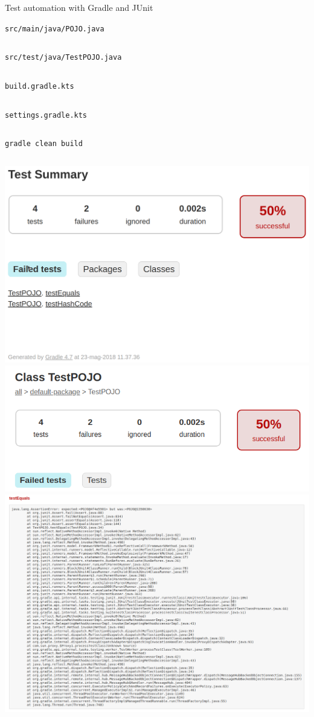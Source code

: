 \documentclass[presentation]{beamer}
\newcommand{\codefile}[4]{
	\begin{block}{\texttt{#2}}
		\inputminted[fontsize=#3,linenos=true,breaklines=true]{#4}{"workspace/#1/#2"}
	\end{block}
}
\newcommand{\java}[3]{\codefile{#1}{#2}{#3}{java}}
\newcommand{\groovy}[3]{\codefile{#1}{#2}{#3}{groovy}}
\newcommand{\terminal}[3]{\codefile{#1}{#2}{#3}{text}}
\newcommand{\tinier}{\fontsize{4pt}{5pt}\selectfont}
\begin{document}
\begin{frame}{Test automation with Gradle and JUnit}
    \java{15-Test}{src/main/java/POJO.java}{\tinier}
    \java{15-Test}{src/test/java/TestPOJO.java}{\tinier}
    \groovy{15-Test}{build.gradle.kts}{\scriptsize}
    \groovy{15-Test}{settings.gradle.kts}{\normalsize}
    \terminal{15-Test}{gradle clean build}{\tiny}
    \centering
    \includegraphics[width=.9\textwidth,height=.8\textheight,keepaspectratio]{img/gradleTestReport0}
    \includegraphics[width=.9\textwidth,height=.8\textheight,keepaspectratio]{img/gradleTestReport1}
    \includegraphics[width=.9\textwidth,height=.8\textheight,keepaspectratio]{img/gradleTestReport2}

\end{frame}
\end{document}
